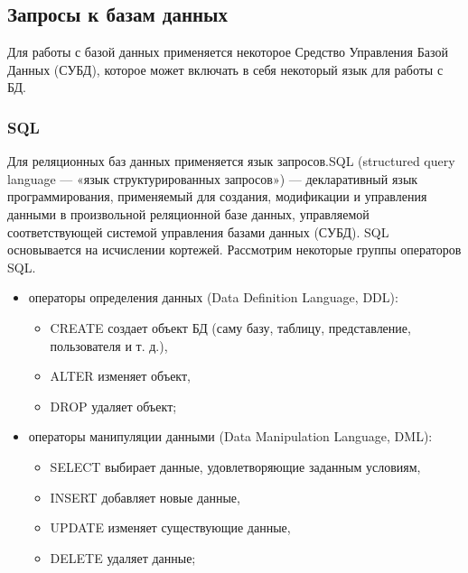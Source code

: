 \subsection{Запросы к базам данных}
Для работы с базой данных применяется некоторое Средство Управления Базой Данных (СУБД), которое может включать в себя некоторый язык для работы с БД.
\subsubsection{SQL}
Для реляционных баз данных применяется язык запросов.SQL (structured query language — «язык структурированных запросов») — декларативный язык программирования, применяемый для создания, модификации и управления данными в произвольной реляционной базе данных, управляемой соответствующей системой управления базами данных (СУБД). SQL основывается на исчислении кортежей.
Рассмотрим некоторые группы операторов SQL.
\begin{itemize}
\item операторы определения данных (Data Definition Language, DDL):
\begin{itemize}
\item CREATE создает объект БД (саму базу, таблицу, представление, пользователя и т. д.),
\item ALTER изменяет объект,
\item DROP удаляет объект;
\end{itemize}
\item операторы манипуляции данными (Data Manipulation Language, DML):
\begin{itemize}
\item SELECT выбирает данные, удовлетворяющие заданным условиям,
\item INSERT добавляет новые данные,
\item UPDATE изменяет существующие данные,
\item DELETE удаляет данные;
\end{itemize}
\end{itemize}
